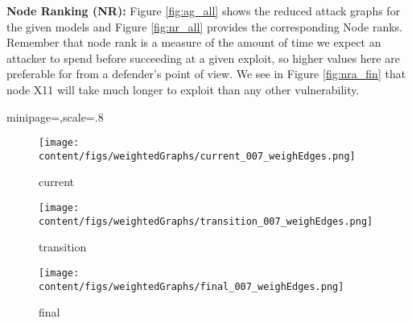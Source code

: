 
\textbf{Node Ranking (NR):  }
Figure \ref{fig:ag_all} shows the reduced attack graphs for the given models and Figure \ref{fig:nr_all} provides the corresponding Node ranks. Remember that node rank is a measure of the amount of time we expect an attacker to spend before succeeding at a given exploit, so higher values here are preferable for from a defender's point of view. We see in Figure \ref{fig:nra_fin} that  node X11 will take much longer to exploit than any other vulnerability. 



\begin{figure*}[ht]
\centering
\begin{adjustbox}{minipage=\linewidth,scale=.8}
\begin{subfigure}{.33\textwidth}
\texttt{[image: content/figs/weightedGraphs/current\_007\_weighEdges.png]}
\caption{current}
\label{fig:ag_currt}
\end{subfigure}%
\begin{subfigure}{.33\textwidth}
\texttt{[image: content/figs/weightedGraphs/transition\_007\_weighEdges.png]}
\caption{transition}
\label{fig:ag_trans}
\end{subfigure}%
\begin{subfigure}{.2\textwidth}
\texttt{[image: content/figs/weightedGraphs/final\_007\_weighEdges.png]}
\caption{final}
\label{fig:ag_fut}
\end{subfigure}%
\caption{Generated Attack Graphs}
\label{fig:ag_all}
\end{adjustbox}
\end{figure*} 


